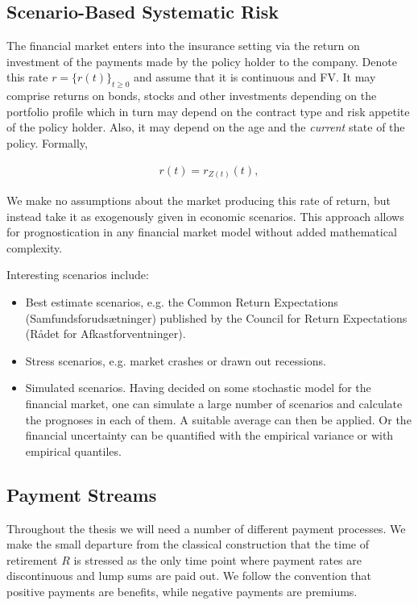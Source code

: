 \documentclass{article}
\newcommand{\1}[1]{\mathbbm{1}_{\left\lbrace #1 \right\rbrace}}
\theoremstyle{break}
\theoremstyle{remark}
\numberwithin{equation}{section}
\begin{document}
\subsection{Scenario-Based Systematic Risk}

The financial market enters into the insurance setting via the return on investment of the payments made by the policy holder to the company. Denote this rate $r = \{ r(t) \}_{t \geq 0}$ and assume that it is continuous and FV. It may comprise returns on bonds, stocks and other investments depending on the portfolio profile which in turn may depend on the contract type and risk appetite of the policy holder. Also, it may depend on the age and the \textit{current} state of the policy. Formally,

\begin{align*}
	r(t) = r_{Z(t)}(t),
\end{align*}

We make no assumptions about the market producing this rate of return, but instead take it as exogenously given in economic scenarios. This approach allows for prognostication in any financial market model without added mathematical complexity.

Interesting scenarios include:

\begin{itemize}
	\item Best estimate scenarios, e.g. the Common Return Expectations (Samfundsforudsætninger) published by the Council for Return Expectations (Rådet for Afkastforventninger).
	\item Stress scenarios, e.g. market crashes or drawn out recessions.
	\item Simulated scenarios. Having decided on some stochastic model for the financial market, one can simulate a large number of scenarios and calculate the prognoses in each of them. A suitable average can then be applied. Or the financial uncertainty can be quantified with the empirical variance or with empirical quantiles.
\end{itemize}

\subsection{Payment Streams} \label{PayStreams}

Throughout the thesis we will need a number of different payment processes. We make the small departure from the classical construction that the time of retirement $R$ is stressed as the only time point where payment rates are discontinuous and lump sums are paid out. We follow the convention that positive payments are benefits, while negative payments are premiums.
\end{document}
